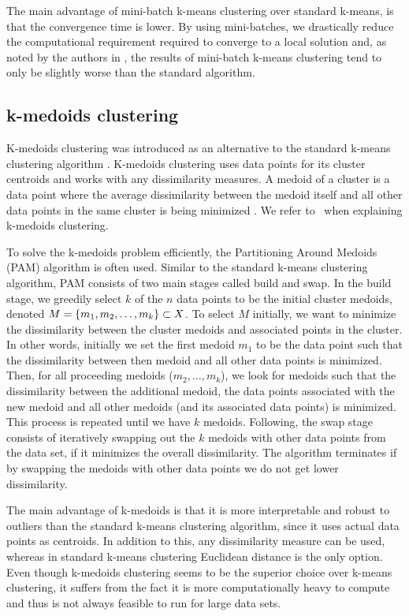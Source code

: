 The main advantage of mini-batch k-means clustering over standard k-means, is that the convergence time is lower. By using mini-batches, we drastically reduce the computational requirement required to converge to a local solution and, as noted by the authors in \cite{sculley2010}, the results of mini-batch k-means clustering tend to only be slightly worse than the standard algorithm.

\subsection{k-medoids clustering}
\label{sec:k-medoids-clustering}
K-medoids clustering was introduced as an alternative to the standard k-means clustering algorithm \cites{Kaufman1990}[p. 427 - 428]{bishop2006}. K-medoids clustering uses data points for its cluster centroids and works with any dissimilarity measures. A medoid of a cluster is a data point where the average dissimilarity between the medoid itself and all other data points in the same cluster is being minimized \cite{Kaufman1990}. We refer to \cites{Kaufman1990}[p. 427 - 428]{bishop2006}\, when explaining k-medoids clustering.

To solve the k-medoids problem efficiently, the Partitioning Around Medoids (PAM) algorithm is often used. Similar to the standard k-means clustering algorithm, PAM consists of two main stages called build and swap. In the build stage, we greedily select $k$ of the $n$ data points to be the initial cluster medoids, denoted $M = \left\{m_1, m_2, \ldots, m_k\right\} \subset X$. To select $M$ initially, we want to minimize the dissimilarity between the cluster medoids and associated points in the cluster. In other words, initially we set the first medoid $m_1$ to be the data point such that the dissimilarity between then medoid and all other data points is minimized. Then, for all proceeding medoids ($m_2, \ldots, m_k$), we look for medoids such that the dissimilarity between the additional medoid, the data points associated with the new medoid and all other medoids (and its associated data points) is minimized. This process is repeated until we have $k$ medoids. Following, the swap stage consists of iteratively swapping out the $k$ medoids with other data points from the data set, if it minimizes the overall dissimilarity. The algorithm terminates if by swapping the medoids with other data points we do not get lower dissimilarity.

The main advantage of k-medoids is that it is more interpretable and robust to outliers than the standard k-means clustering algorithm, since it uses actual data points as centroids. In addition to this, any dissimilarity measure can be used, whereas in standard k-means clustering Euclidean distance is the only option. Even though k-medoids clustering seems to be the superior choice over k-means clustering, it suffers from the fact it is more computationally heavy to compute and thus is not always feasible to run for large data sets.

